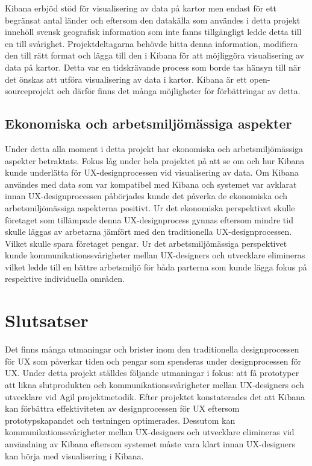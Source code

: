 \documentclass[12pt]{kththesis}
\begin{document}
Kibana erbjöd stöd för visualisering av data på kartor men endast för ett begränsat antal länder och eftersom den datakälla som användes i detta projekt innehöll svensk geografisk information som inte fanns tillgängligt ledde detta till en till svårighet. Projektdeltagarna behövde hitta denna information, modifiera den till rätt format och lägga till den i Kibana för att möjliggöra visualisering av data på kartor. Detta var en tidskrävande process som borde tas hänsyn till när det önskas att utföra visualisering av data i kartor. Kibana är ett open-sourceprojekt och därför finns det många möjligheter för förbättringar av detta.  

\section{Ekonomiska och arbetsmiljömässiga aspekter}
Under detta alla moment i detta projekt har ekonomiska och arbetsmiljömässiga aspekter betraktats. Fokus låg under hela projektet på att se om och hur Kibana kunde underlätta för UX-designprocessen vid visualisering av data. Om Kibana användes med data som var kompatibel med Kibana och systemet var avklarat innan UX-designprocessen påbörjades kunde det påverka de ekonomiska och arbetsmiljömässiga aspekterna positivt. Ur det ekonomiska perspektivet skulle företaget som tillämpade denna UX-designprocess gynnas eftersom mindre tid skulle läggas av arbetarna jämfört med den traditionella UX-designprocessen. Vilket skulle spara företaget pengar. Ur det arbetsmiljömässiga perspektivet kunde kommunikationssvårigheter mellan UX-designers och utvecklare elimineras vilket ledde till en bättre arbetsmiljö för båda parterna som kunde lägga fokus på respektive individuella områden.

\afterpage{\null\newpage}

\chapter{Slutsatser}
Det finns många utmaningar och brister inom den traditionella designprocessen för UX som påverkar tiden och pengar som spenderas under designprocessen för UX. Under detta projekt ställdes följande utmaningar i fokus: att få prototyper att likna slutprodukten och kommunikationssvårigheter mellan UX-designers och utvecklare vid Agil projektmetodik. Efter projektet konstaterades det att Kibana kan förbättra effektiviteten av designprocessen för UX eftersom prototypskapandet och testningen optimerades. Dessutom  kan kommunikationssvårigheter mellan UX-designers och utvecklare elimineras vid användning av Kibana eftersom systemet måste vara klart innan UX-designers kan börja med visualisering i Kibana. 
\end{document}
